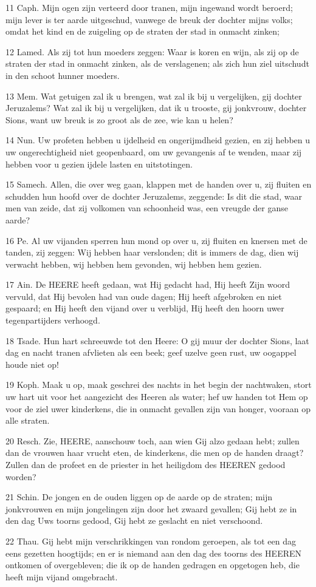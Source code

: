 \par 11 Caph. Mijn ogen zijn verteerd door tranen, mijn ingewand wordt beroerd; mijn lever is ter aarde uitgeschud, vanwege de breuk der dochter mijns volks; omdat het kind en de zuigeling op de straten der stad in onmacht zinken;
\par 12 Lamed. Als zij tot hun moeders zeggen: Waar is koren en wijn, als zij op de straten der stad in onmacht zinken, als de verslagenen; als zich hun ziel uitschudt in den schoot hunner moeders.
\par 13 Mem. Wat getuigen zal ik u brengen, wat zal ik bij u vergelijken, gij dochter Jeruzalems? Wat zal ik bij u vergelijken, dat ik u trooste, gij jonkvrouw, dochter Sions, want uw breuk is zo groot als de zee, wie kan u helen?
\par 14 Nun. Uw profeten hebben u ijdelheid en ongerijmdheid gezien, en zij hebben u uw ongerechtigheid niet geopenbaard, om uw gevangenis af te wenden, maar zij hebben voor u gezien ijdele lasten en uitstotingen.
\par 15 Samech. Allen, die over weg gaan, klappen met de handen over u, zij fluiten en schudden hun hoofd over de dochter Jeruzalems, zeggende: Is dit die stad, waar men van zeide, dat zij volkomen van schoonheid was, een vreugde der ganse aarde?
\par 16 Pe. Al uw vijanden sperren hun mond op over u, zij fluiten en knersen met de tanden, zij zeggen: Wij hebben haar verslonden; dit is immers de dag, dien wij verwacht hebben, wij hebben hem gevonden, wij hebben hem gezien.
\par 17 Ain. De HEERE heeft gedaan, wat Hij gedacht had, Hij heeft Zijn woord vervuld, dat Hij bevolen had van oude dagen; Hij heeft afgebroken en niet gespaard; en Hij heeft den vijand over u verblijd, Hij heeft den hoorn uwer tegenpartijders verhoogd.
\par 18 Tsade. Hun hart schreeuwde tot den Heere: O gij muur der dochter Sions, laat dag en nacht tranen afvlieten als een beek; geef uzelve geen rust, uw oogappel houde niet op!
\par 19 Koph. Maak u op, maak geschrei des nachts in het begin der nachtwaken, stort uw hart uit voor het aangezicht des Heeren als water; hef uw handen tot Hem op voor de ziel uwer kinderkens, die in onmacht gevallen zijn van honger, vooraan op alle straten.
\par 20 Resch. Zie, HEERE, aanschouw toch, aan wien Gij alzo gedaan hebt; zullen dan de vrouwen haar vrucht eten, de kinderkens, die men op de handen draagt? Zullen dan de profeet en de priester in het heiligdom des HEEREN gedood worden?
\par 21 Schin. De jongen en de ouden liggen op de aarde op de straten; mijn jonkvrouwen en mijn jongelingen zijn door het zwaard gevallen; Gij hebt ze in den dag Uws toorns gedood, Gij hebt ze geslacht en niet verschoond.
\par 22 Thau. Gij hebt mijn verschrikkingen van rondom geroepen, als tot een dag eens gezetten hoogtijds; en er is niemand aan den dag des toorns des HEEREN ontkomen of overgebleven; die ik op de handen gedragen en opgetogen heb, die heeft mijn vijand omgebracht.

